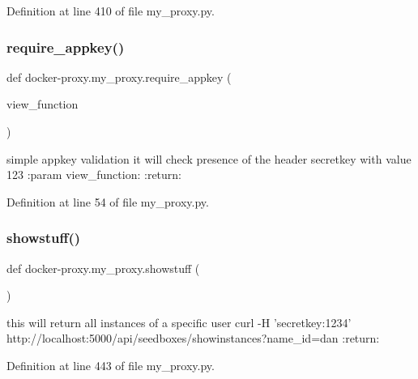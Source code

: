 Definition at line 410 of file my\+\_\+proxy.\+py.

\hypertarget{namespacedocker-proxy_1_1my__proxy_a219b29b5c79ad35297fb1f1deef275a3}{}\label{namespacedocker-proxy_1_1my__proxy_a219b29b5c79ad35297fb1f1deef275a3} 
\subsubsection{\texorpdfstring{require\+\_\+appkey()}{require\_appkey()}}
{\footnotesize\ttfamily def docker-\/proxy.\+my\+\_\+proxy.\+require\+\_\+appkey (\begin{DoxyParamCaption}\item[{}]{view\+\_\+function }\end{DoxyParamCaption})}

\begin{DoxyVerb}simple appkey validation
it will check presence of the header secretkey with value 123
:param view_function:
:return:
\end{DoxyVerb}
 

Definition at line 54 of file my\+\_\+proxy.\+py.

\hypertarget{namespacedocker-proxy_1_1my__proxy_a84a1e1b9285c530fcd8b04177d08cdb3}{}\label{namespacedocker-proxy_1_1my__proxy_a84a1e1b9285c530fcd8b04177d08cdb3} 
\subsubsection{\texorpdfstring{showstuff()}{showstuff()}}
{\footnotesize\ttfamily def docker-\/proxy.\+my\+\_\+proxy.\+showstuff (\begin{DoxyParamCaption}{ }\end{DoxyParamCaption})}

\begin{DoxyVerb}this will return all instances of a specific user
curl -H 'secretkey:1234' http://localhost:5000/api/seedboxes/showinstances?name_id=dan
:return:
\end{DoxyVerb}
 

Definition at line 443 of file my\+\_\+proxy.\+py.

